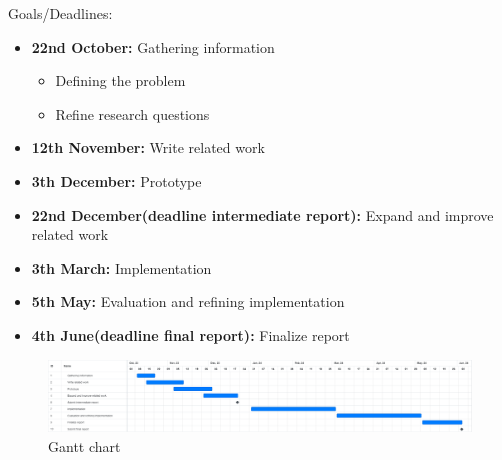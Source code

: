 Goals/Deadlines:
\begin{itemize}
	\item \textbf{22nd October: } Gathering information 
	\begin{itemize}
		\item Defining the problem
		\item Refine research questions
	\end{itemize}
	\item \textbf{12th November: } Write related work
	\item \textbf{3th December: } Prototype
	\item \textbf{22nd December(deadline intermediate report): } Expand and improve related work
	\item \textbf{3th March: } Implementation
	\item \textbf{5th May: } Evaluation and refining implementation
	\item \textbf{4th June(deadline final report): } Finalize report
\end{itemize}


\begin{figure}
	\centering
	\includegraphics[width=\pdfpagewidth]{fig/startup_report/gantt_final.png}
	\caption{Gantt chart}
	\label{fig:gantt_chart}
\end{figure}